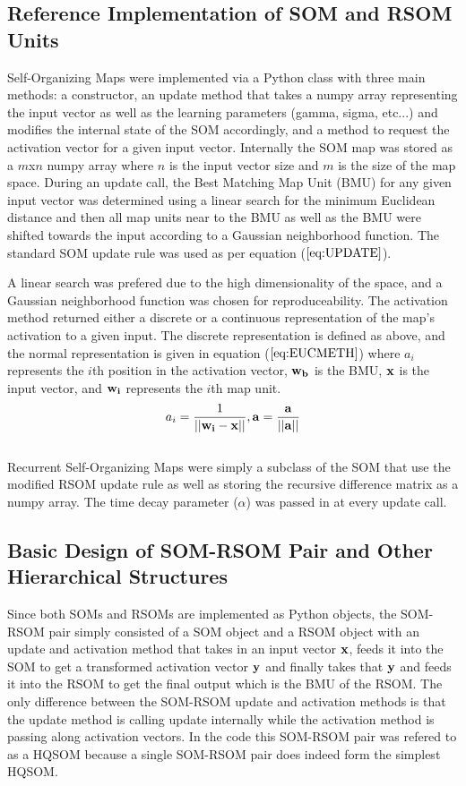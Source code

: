 \documentclass[a4paper,10pt]{article}
\begin{document}
\subsection{Reference Implementation of SOM and RSOM Units}
Self-Organizing Maps were implemented via a Python class with three main methods: a constructor,
an update method that takes a numpy array representing the input vector as well as the learning
parameters (gamma, sigma, etc...) and modifies the internal state of the SOM accordingly, and a
method to request the activation vector for a given input vector. Internally the SOM map was stored
as a $m$x$n$ numpy array where $n$ is the input vector size and $m$ is the size of the map space. 
During an update call, the Best Matching Map Unit (BMU) for any given input vector was determined
using a linear search for the minimum Euclidean distance and then all map units near to the BMU as
well as the BMU were shifted towards the input according to a Gaussian neighborhood function.  The
standard SOM update rule was used as per equation ($\ref{eq:UPDATE}$).
 
A linear search was prefered due to the high dimensionality of the space, and a Gaussian
neighborhood function was chosen for reproduceability.  The activation method returned either a
discrete or a continuous representation of the map's activation to a given input. The discrete
representation is defined as above, and the normal representation is given in equation
($\ref{eq:EUCMETH}$) where $a_i$ represents the $i$th position in the activation vector,
$\bold{w_b}$ is the BMU, $\bold{x}$ is the input vector, and $\bold{w_i}$ represents the $i$th map
unit.
\begin{equation} \label{eq:EUCMETH}
 a_i = \frac{1}{||\bold{w_i}-\bold{x}||}, \bold{a} = \frac{\bold{a}}{||\bold{a}||}
\end{equation}
\\
Recurrent Self-Organizing Maps were simply a subclass of the SOM that use the modified RSOM update
rule as well as storing the recursive difference matrix as a numpy array.  The time decay parameter
($\alpha$) was passed in at every update call.

\subsection{Basic Design of SOM-RSOM Pair and Other Hierarchical Structures}
Since both SOMs and RSOMs are implemented as Python objects, the SOM-RSOM pair simply consisted of
a SOM object and a RSOM object with an update and activation method that takes in an input vector
$\bold{x}$, feeds it into the SOM to get a transformed activation vector $\bold{y}$ and finally
takes that $\bold{y}$ and feeds it into the RSOM to get the final output which is the BMU of the
RSOM.  The only difference between the SOM-RSOM update and activation methods is that the update
method is calling update internally while the activation method is passing along activation
vectors. In the code this SOM-RSOM pair was refered to as a HQSOM because a single SOM-RSOM pair
does indeed form the simplest HQSOM.
\end{document}

